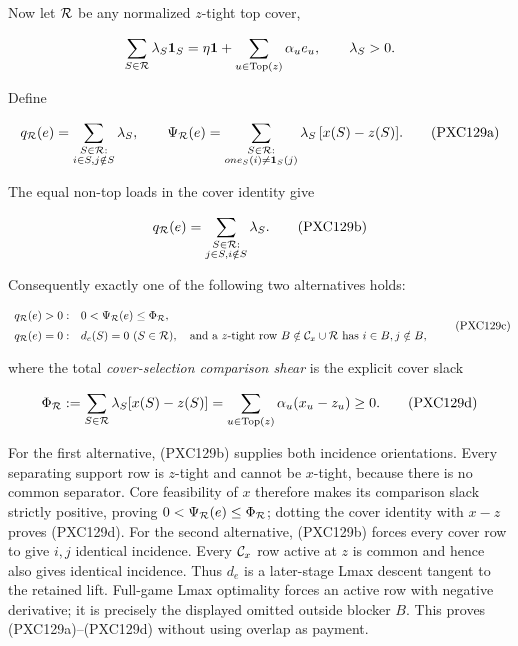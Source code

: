 \documentclass[11pt]{article}
\newcommand{\one}{\mathbf 1}
\begin{document}
Now let ${\cal R}$ be any normalized $z$-tight top cover,

\[
 \sum_{S\in{\cal R}}\lambda_S\one_S
 =\eta\one+\sum_{u\in\operatorname{Top}(z)}\alpha_u e_u,
 \qquad \lambda_S>0.
\]

Define

\begin{equation}
 q_{\cal R}(e)=
 \sum_{\substack{S\in{\cal R}:\\i\in S, j\notin S}}\lambda_S,
 \qquad
 \Psi_{\cal R}(e)=
 \sum_{\substack{S\in{\cal R}:\\one_S(i)\ne\one_S(j)}}
       \lambda_S\,[x(S)-z(S)].                       \tag{PXC129a}
\end{equation}

The equal non-top loads in the cover identity give

\begin{equation}
 q_{\cal R}(e)=
 \sum_{\substack{S\in{\cal R}:\\j\in S, i\notin S}}\lambda_S.
                                                               \tag{PXC129b}
\end{equation}

Consequently exactly one of the following two alternatives holds:

\begin{equation}
\begin{array}{ll}
q_{\cal R}(e)>0:
 &0<\Psi_{\cal R}(e)\le\Phi_{\cal R},\\[2mm]
q_{\cal R}(e)=0:
 &d_e(S)=0\ (S\in{\cal R}),\quad
   \text{and a $z$-tight row }B\notin{\cal C}_x\cup{\cal R}
   \text{ has }i\in B, j\notin B,
\end{array}                                                   \tag{PXC129c}
\end{equation}

where the total \emph{cover-selection comparison shear} is the explicit
cover slack

\begin{equation}
 \Phi_{\cal R}:=
 \sum_{S\in{\cal R}}\lambda_S[x(S)-z(S)]
 =\sum_{u\in\operatorname{Top}(z)}\alpha_u(x_u-z_u)\ge0. \tag{PXC129d}
\end{equation}

For the first alternative, (PXC129b) supplies both incidence orientations.
Every separating support row is $z$-tight and cannot be $x$-tight, because
there is no common separator.  Core feasibility of $x$ therefore makes its
comparison slack strictly positive, proving
$0<\Psi_{\cal R}(e)\le\Phi_{\cal R}$; dotting the cover identity with
$x-z$ proves (PXC129d).  For the second alternative, (PXC129b) forces every
cover row to give $i,j$ identical incidence.  Every ${\cal C}_x$ row active
at $z$ is common and hence also gives identical incidence.  Thus $d_e$ is a
later-stage Lmax descent tangent to the retained lift.  Full-game Lmax
optimality forces an active row with negative derivative; it is precisely
the displayed omitted outside blocker $B$.  This proves
(PXC129a)--(PXC129d) without using overlap as payment.
\end{document}
